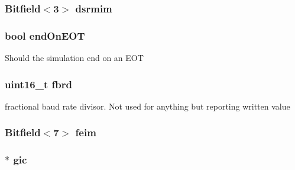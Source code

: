 \label{classPl011_a40464feb8779903fa2eb809556b2c537}
\hypertarget{classPl011_abdf5197925837e4ab21e9342961419d6}{
\subsubsection[{dsrmim}]{\setlength{\rightskip}{0pt plus 5cm}Bitfield$<$3$>$ {\bf dsrmim}}}
\label{classPl011_abdf5197925837e4ab21e9342961419d6}
\hypertarget{classPl011_aad163d2d82e9b9e707ca4da55b667c1e}{
\subsubsection[{endOnEOT}]{\setlength{\rightskip}{0pt plus 5cm}bool {\bf endOnEOT}}}
\label{classPl011_aad163d2d82e9b9e707ca4da55b667c1e}
Should the simulation end on an EOT \hypertarget{classPl011_aa3ac821540cc12f9e0436651df0b1642}{
\subsubsection[{fbrd}]{\setlength{\rightskip}{0pt plus 5cm}uint16\_\-t {\bf fbrd}}}
\label{classPl011_aa3ac821540cc12f9e0436651df0b1642}
fractional baud rate divisor. Not used for anything but reporting written value \hypertarget{classPl011_a705d2bcd8e859d1b15dd6e128533b295}{
\subsubsection[{feim}]{\setlength{\rightskip}{0pt plus 5cm}Bitfield$<$7$>$ {\bf feim}}}
\label{classPl011_a705d2bcd8e859d1b15dd6e128533b295}
\hypertarget{classPl011_a2e2266dca56928f63667e994933169ee}{
\subsubsection[{gic}]{$\ast$ {\bf gic}}}
